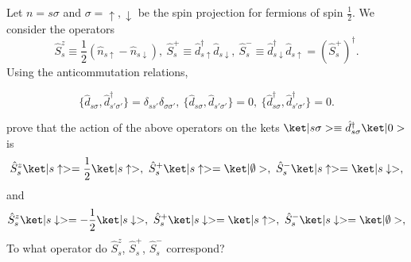 \begin{problem}
  Let $n = s\sigma$ and $\sigma = \uparrow,\downarrow$
  be the spin projection for fermions of spin $\frac12$.
  We consider the operators
  \[
    \hat S_s^z \equiv \frac12 (\hat n_{s\uparrow} - \hat n_{s\downarrow}),~
    \hat S_s^+ \equiv \hat d_{s\uparrow}^\dagger \hat d_{s\downarrow},~
    \hat S_s^- \equiv \hat d_{s\downarrow}^\dagger \hat d_{s\uparrow}
  = (\hat S_s^+)^\dagger.
  \]
  Using the anticommutation relations,
  \begin{framed}
  \[
    \{\hat d_{s\sigma}, \hat d_{s'\sigma'}^\dagger\}
  = \delta_{ss'} \delta_{\sigma\sigma'},~
    \{\hat d_{s\sigma}, \hat d_{s'\sigma'}\} = 0,~
    \{\hat d_{s\sigma}^\dagger, \hat d_{s'\sigma'}^\dagger\} = 0.
  \]
  \end{framed}
  prove that the action of
  the above operators on the kets
  $\ket|s\sigma> \equiv \hat d_{s\sigma}^\dagger \ket|0>$ is
  \[
    \hat S_s^z \ket|s\uparrow> = \frac12 \ket|s\uparrow>,~
    \hat S_s^+ \ket|s\uparrow> = \ket|\emptyset>,~
    \hat S_s^- \ket|s\uparrow> = \ket|s\downarrow>,
  \]
  and
  \[
    \hat S_s^z \ket|s\downarrow> = -\frac12 \ket|s\downarrow>,~
    \hat S_s^+ \ket|s\downarrow> = \ket|s\uparrow>,~
    \hat S_s^- \ket|s\downarrow> = \ket|\emptyset>,
  \]
  To what operator do $\hat S_s^z$, $\hat S_s^+$, $\hat S_s^-$ correspond?
\end{problem}
